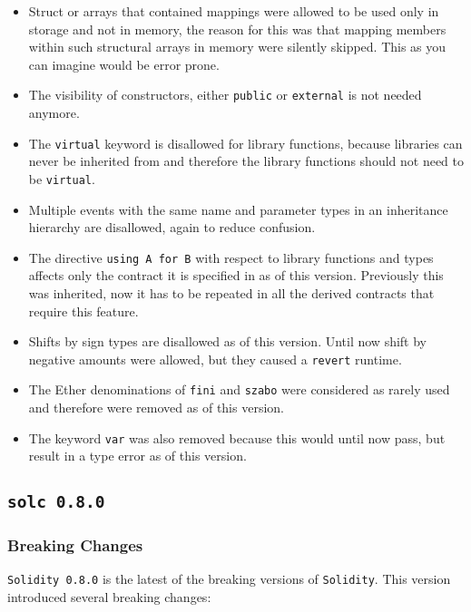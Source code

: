 \begin{itemize}
\tightlist
\item
  Struct or arrays that contained mappings were allowed to be used only
  in storage and not in memory, the reason for this was that mapping
  members within such structural arrays in memory were silently skipped.
  This as you can imagine would be error prone.
\item
  The visibility of constructors, either \texttt{public} or
  \texttt{external} is not needed anymore.
\item
  The \texttt{virtual} keyword is disallowed for library functions,
  because libraries can never be inherited from and therefore the
  library functions should not need to be \texttt{virtual}.
\item
  Multiple events with the same name and parameter types in an
  inheritance hierarchy are disallowed, again to reduce confusion.
\item
  The directive \texttt{using\ A\ for\ B} with respect to library
  functions and types affects only the contract it is specified in as of
  this version. Previously this was inherited, now it has to be repeated
  in all the derived contracts that require this feature.
\item
  Shifts by sign types are disallowed as of this version. Until now
  shift by negative amounts were allowed, but they caused a
  \texttt{revert} runtime.
\item
  The Ether denominations of \texttt{fini} and \texttt{szabo} were
  considered as rarely used and therefore were removed as of this
  version.
\item
  The keyword \texttt{var} was also removed because this would until now
  pass, but result in a type error as of this version.
\end{itemize}

\subsection{\texorpdfstring{\texttt{solc\ 0.8.0}}{solc 0.8.0}}\label{solc-0.8.0}

\subsubsection{Breaking Changes}\label{breaking-changes-2}

\texttt{Solidity\ 0.8.0} is the latest of the breaking versions of
\texttt{Solidity}. This version introduced several breaking changes:

